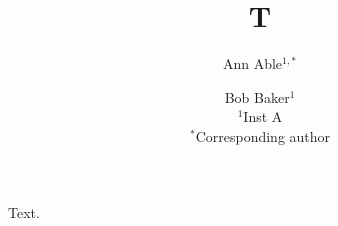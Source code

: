 \documentclass{article}
\begin{document}
\title{T}
\author{Ann Able$^{1,*}$ \and Bob Baker$^1$\\
$^1$Inst A\\
$^{*}$Corresponding author}
\maketitle
Text.
\end{document}
